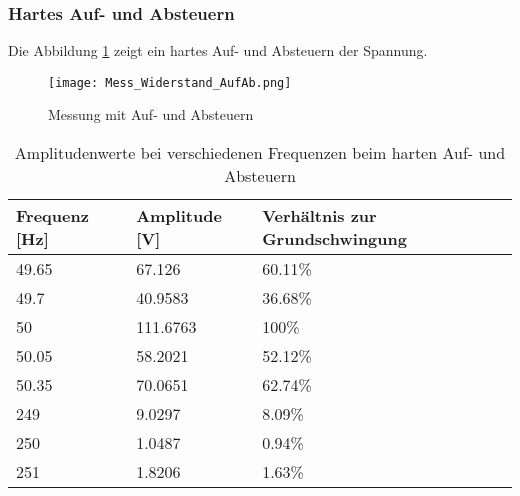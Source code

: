 \newpage
\subsubsection*{Hartes Auf- und Absteuern}
Die Abbildung \ref{fig:Mess_Sanft} zeigt ein hartes Auf- und Absteuern der Spannung.

\begin{figure}[ht!]
	\centering
	\texttt{[image: Mess\_Widerstand\_AufAb.png]}	
	\caption{Messung mit Auf- und Absteuern}\label{fig:Mess_Sanft}
\end{figure}


\begin{table}[ht!]
	\centering
	\begin{tabular}{|l|l|l|}
		\hline
		Frequenz {[}Hz{]} & Amplitude {[}V{]} & Verhältnis zur Grundschwingung \\ \hline
		49.65             & 67.126            & 60.11\%                        \\ \hline
		49.7              & 40.9583           & 36.68\%                        \\ \hline
		50                & 111.6763          & 100\%                          \\ \hline
		50.05             & 58.2021           & 52.12\%                        \\ \hline
		50.35             & 70.0651           & 62.74\%                        \\ \hline
		249               & 9.0297            & 8.09\%                         \\ \hline
		250               & 1.0487            & 0.94\%                         \\ \hline
		251 		      & 1.8206            & 1.63\%                         \\ \hline
	\end{tabular}
\caption{Amplitudenwerte bei verschiedenen Frequenzen beim harten Auf- und Absteuern}\label{tab:Mess_Spannung_AufAb_hart}
\end{table}

